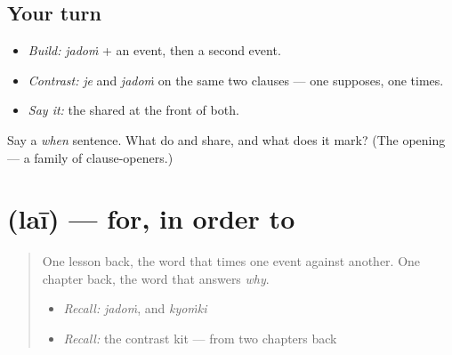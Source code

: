 \subsection*{Your turn}
\begin{itemize}
\raggedright
  \item \emph{Build:} \emph{jadoṁ} + an event, then a second event.
  \item \emph{Contrast:} \emph{je} and \emph{jadoṁ} on the same two clauses — one supposes, one times.
  \item \emph{Say it:} the shared \textbf{} at the front of both.
\end{itemize}

\begin{tcolorbox}[breakable,colback=teal!4,colframe=teal!35!black,title={Before you move on}]
Say a \emph{when} sentence. What do \textbf{} and \textbf{} share, and what does it mark? (The opening \textbf{} — a family of clause-openers.)
\end{tcolorbox}
\section[\texorpdfstring{\pa{ਲਈ} (laī)}{ਲਈ (laī)}]{ (laī) — for, in order to}

\label{lesson:PA-C41-lai}



\begin{quote}
One lesson back, the word that times one event against another. One chapter back, the word that answers \emph{why}.

\begin{itemize}
\raggedright
  \item \emph{Recall:} \emph{jadoṁ}, and \emph{kyoṁki}
  \item \emph{Recall:} the contrast kit — from two chapters back
\end{itemize}
\end{quote}

